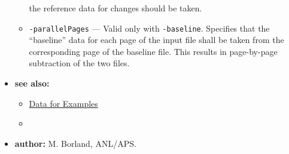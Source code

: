 \begin{itemize}
\begin{itemize}
        the reference data for changes should be taken.
    \item {\tt -parallelPages} --- Valid only with {\tt -baseline}.   Specifies that the ``baseline''
        data for each page of the input file shall be taken from the corresponding page of the
        baseline file.  This results in page-by-page subtraction of the two files.
    \end{itemize}
\item {\bf see also:}
    \begin{itemize}
    \item \hyperref[exampleData]{Data for Examples}
    \item {}
    \end{itemize}
\item {\bf author:} M. Borland, ANL/APS.
\end{itemize}

